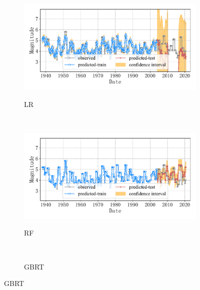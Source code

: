 \begin{figure}[!htbp]
\begin{subfigure}[b]{0.45\textwidth}
    \caption{LR}
    \vspace{-0.2cm}
    \includegraphics[width=\textwidth]{Img/chap5_seism/block6/seism_lr_minyear_1932_maxyear_2021_spanlat_2_spanlon_4_timewindow_72_nextmonth_12_minmag_3.0_block_6.pdf}
    \vspace{-1cm}
    \label{fig:seism_lr_minyear_1932_maxyear_2021_spanlat_2_spanlon_4_timewindow_72_nextmonth_12_minmag_3.0_block_6}
  \end{subfigure}
  ~
  \begin{subfigure}[b]{0.45\textwidth}
    \caption{RF}
    \vspace{-0.2cm}
    \includegraphics[width=\textwidth]{Img/chap5_seism/block6/seism_rf_minyear_1932_maxyear_2021_spanlat_2_spanlon_4_timewindow_72_nextmonth_12_minmag_3.0_block_6.pdf}
    \vspace{-1cm}
    \label{fig:seism_rf_minyear_1932_maxyear_2021_spanlat_2_spanlon_4_timewindow_72_nextmonth_12_minmag_3.0_block_6}
  \end{subfigure}
  \\
  \begin{subfigure}[b]{0.45\textwidth}
    \caption{GBRT}
    \vspace{-0.2cm}

\end{subfigure}
\end{figure}
